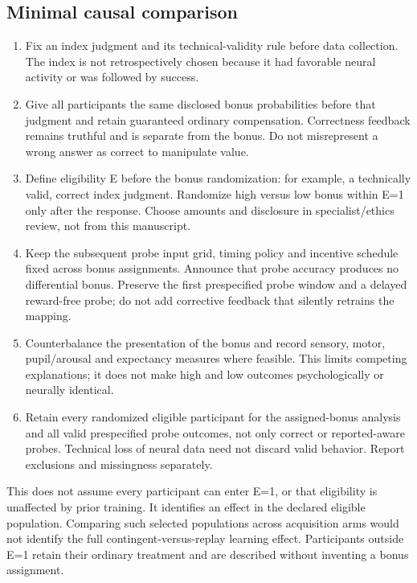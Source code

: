 \documentclass[
  american,
  11pt,
  letterpaper,
]{article}
\providecommand{\tightlist}{%
  \setlength{\itemsep}{0pt}\setlength{\parskip}{0pt}}
\begin{document}
\subsection{Minimal causal comparison}\label{minimal-causal-comparison}

\begin{enumerate}
\def\labelenumi{\arabic{enumi}.}
\tightlist
\item
  Fix an index judgment and its technical-validity rule before data collection. The index is not retrospectively chosen because it had favorable neural activity or was followed by success.
\item
  Give all participants the same disclosed bonus probabilities before that judgment and retain guaranteed ordinary compensation. Correctness feedback remains truthful and is separate from the bonus. Do not misrepresent a wrong answer as correct to manipulate value.
\item
  Define eligibility E before the bonus randomization: for example, a technically valid, correct index judgment. Randomize high versus low bonus within E=1 only after the response. Choose amounts and disclosure in specialist/ethics review, not from this manuscript.
\item
  Keep the subsequent probe input grid, timing policy and incentive schedule fixed across bonus assignments. Announce that probe accuracy produces no differential bonus. Preserve the first prespecified probe window and a delayed reward-free probe; do not add corrective feedback that silently retrains the mapping.
\item
  Counterbalance the presentation of the bonus and record sensory, motor, pupil/arousal and expectancy measures where feasible. This limits competing explanations; it does not make high and low outcomes psychologically or neurally identical.
\item
  Retain every randomized eligible participant for the assigned-bonus analysis and all valid prespecified probe outcomes, not only correct or reported-aware probes. Technical loss of neural data need not discard valid behavior. Report exclusions and missingness separately.
\end{enumerate}

This does not assume every participant can enter E=1, or that eligibility is unaffected by prior training. It identifies an effect in the declared eligible population. Comparing such selected populations across acquisition arms would not identify the full contingent-versus-replay learning effect. Participants outside E=1 retain their ordinary treatment and are described without inventing a bonus assignment.
\end{document}
